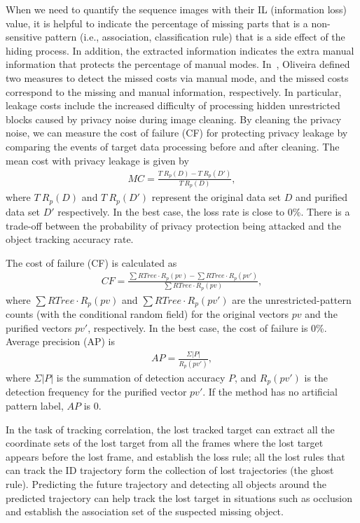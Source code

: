 \documentclass[trans]{IEEEtran}
\begin{document}
When we need to quantify the sequence images with their IL (information loss) value, it is helpful to indicate the percentage of missing parts that is a non-sensitive pattern (i.e., association, classification rule) that is a side effect of the hiding process. In addition, the extracted information indicates the extra manual information that protects the percentage of manual modes. In~\cite{oliveira2002privacy}, Oliveira defined two measures to detect the missed costs via manual mode, and the missed costs correspond to the missing and manual information, respectively. In particular, leakage costs include the increased difficulty of processing hidden unrestricted blocks caused by privacy noise during image cleaning. By cleaning the privacy noise, we can measure the cost of failure (CF) for protecting privacy leakage by comparing the events of target data processing before and after cleaning. The mean cost with privacy leakage is given by
\begin{eqnarray}\label{equ:MCdet}
MC = \frac{T~R_p(D)-T~R_p(D')}{T~R_p(D)},
\end{eqnarray}
where $T~R_p(D)$ and $T~R_p(D')$ represent the original data set $D$ and purified data set $D'$ respectively. In the best case, the loss rate is close to 0\%. There is a trade-off between the probability of privacy protection being attacked and the object tracking accuracy rate.

The cost of failure (CF) is calculated as
\begin{eqnarray}\label{equ:MCdet2}
CF = \frac{ \sum{RTree \cdot R_p(pv)}- \sum{RTree \cdot R_p(pv')}}{ \sum{RTree \cdot R_p(pv)}},
\end{eqnarray}
where $\sum RTree \cdot R_p(pv)$ and $\sum RTree \cdot R_p(pv')$ are the unrestricted-pattern counts (with the conditional random field) for the original vectors $pv$ and the purified vectors $pv'$, respectively. In the best case, the cost of failure is 0\%. Average precision (AP) is
\begin{eqnarray}\label{equ:APdet}
AP = \frac{\Sigma|P|}{R_p (pv')},
\end{eqnarray}
where $\Sigma|P|$ is the summation of detection accuracy $P$, and $R_p(pv')$ is the detection frequency for the purified vector $pv'$. If the method has no artificial pattern label, $AP$ is 0.

In the task of tracking correlation, the lost tracked target can extract all the coordinate sets of the lost target from all the frames where the lost target appears before the lost frame, and establish the loss rule; all the lost rules that can track the ID trajectory form the collection of lost trajectories (the ghost rule). Predicting the future trajectory and detecting all objects around the predicted trajectory can help track the lost target in situations such as occlusion and establish the association set of the suspected missing object.
\end{document}
